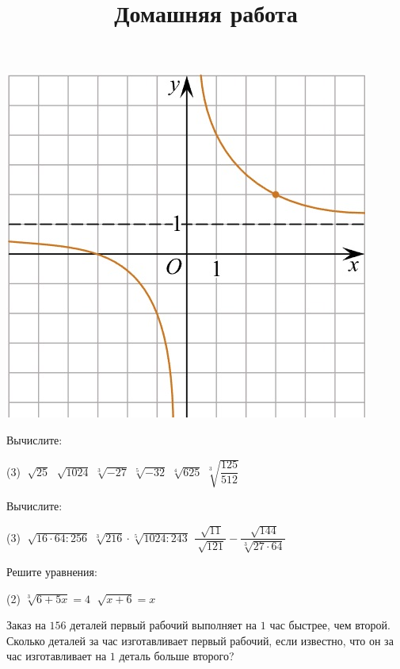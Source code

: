 \begin{consultation}
\begin{listofex}
\begin{minipage}[t]{\picwidth}
			\includegraphics[align=t, width=\textwidth]{../pics/G101M4C5-1.jpg}
		\end{minipage}
	\end{listofex}
		\newpage
		\title{Домашняя работа}
	\begin{listofex}
		\item Вычислите:
		\begin{tasks}(3)
			\task \( \sqrt[]{25} \)
			\task \( \sqrt[]{1024} \)
			\task \( \sqrt[3]{-27} \)
			\task \( \sqrt[5]{-32} \)
			\task \( \sqrt[4]{625} \)
			\task \( \sqrt[3]{\dfrac{125}{512}} \)
		\end{tasks}
		\item Вычислите:
		\begin{tasks}(3)
			\task \( \sqrt[]{16 \cdot 64 : 256} \)
			\task \( \sqrt[3]{216} \cdot \sqrt[5]{1024 : 243} \)
			\task \( \dfrac{\sqrt[]{11}}{\sqrt[]{121}} - \dfrac{\sqrt[]{144}}{\sqrt[3]{27 \cdot 64}} \)
		\end{tasks}
		\item Решите уравнения:
		\begin{tasks}(2)
			\task \( \sqrt[3]{6+5x} = 4 \)
			\task \( \sqrt[]{x+6}=x \)
		\end{tasks}
		\item Заказ на \(156\) деталей первый рабочий выполняет на \(1\) час быстрее, чем второй. Сколько деталей за час изготавливает первый рабочий, если известно, что он за час изготавливает на \(1\) деталь больше второго?
	\end{listofex}
\end{consultation}
